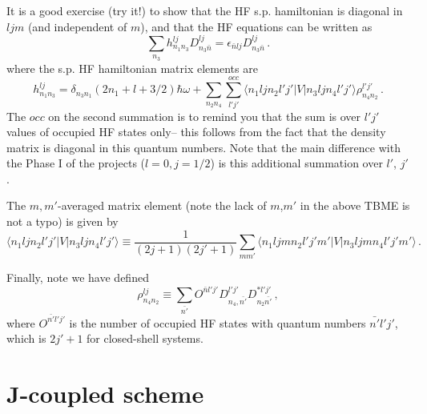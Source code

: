 \documentclass[letterpaper,12pt]{article}
\begin{document}
It is a good exercise (try it!) to show that the HF s.p. hamiltonian is diagonal in $ljm$ (and independent of $m$), and that the HF equations can be written as
\begin{equation}
\sum_{n_3} h^{lj}_{n_1n_3}D^{lj}_{n_3\bar{n}} = \epsilon_{\bar{n}lj}D^{lj}_{n_3\bar{n}}\,.
\end{equation} 
 where the s.p. HF hamiltonian matrix elements are 
\begin{equation}
h^{lj}_{n_1n_3} = \delta_{n_3 n_1}(2n_1+l + 3/2)\hbar\omega + \sum_{n_2n_4}\sum_{l'j'}^{occ}\langle n_1ljn_2l'j'|V|n_3ljn_4l'j'\rangle\rho^{l'j'}_{n_4n_2}\,.
\end{equation}
The $occ$ on the second summation is to remind you that the sum is over $l'j'$ values of occupied HF states only-- this follows from the fact that the density matrix is diagonal in this quantum numbers. Note that the main difference with the Phase I of the projects ($l=0, j=1/2$) is this additional summation over $l'$, $j'$.

The $m,m'$-averaged matrix element (note the lack of $m$,$m'$ in the above TBME is not a typo) is given by
\begin{equation}
\label{eq:mavgTBME}
\langle n_1ljn_2l'j'|V|n_3ljn_4l'j'\rangle \equiv \frac{1}{(2j+1)(2j'+1)}\sum_{mm'}  \langle n_1ljmn_2l'j'm'|V|n_3ljmn_4l'j'm'\rangle\,.
\end{equation}

Finally, note we have defined
\begin{equation}
\rho^{lj}_{n_4n_2} \equiv \sum_{\bar{n'}} O^{\bar{n}l'j'}D^{l'j'}_{n_4,\bar{n'}}D^{*l'j'}_{n_2\bar{n'}}\,,
\end{equation}
where $O^{\bar{n'}l'j'}$ is the number of occupied HF states with quantum numbers $\bar{n'}l'j'$, which is $2j'+1$ for closed-shell systems. 


\section{J-coupled scheme}
\end{document}
